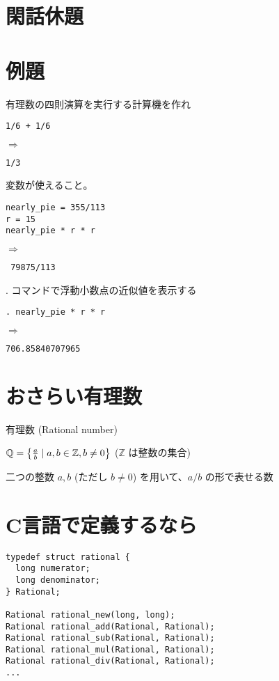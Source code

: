 \documentclass[slide,papersize,fleqn]{jsarticle}
\begin{document}
\section{閑話休題}
\figureA
\section{例題}
有理数の四則演算を実行する計算機を作れ
\tiny
\begin{tcolorbox}[box align=center,width=0.5\hsize,nobeforeafter]
  \texttt{1/6 + 1/6}
\end{tcolorbox}
{$\Rightarrow$}
\begin{tcolorbox}[box align=center,width=0.4\hsize,nobeforeafter]
\texttt{1/3}
\end{tcolorbox}
\vfill
変数が使えること。
\vfill
\begin{tcolorbox}[box align=center,width=0.5\hsize,nobeforeafter]
\begin{verbatim}
nearly_pie = 355/113
r = 15
nearly_pie * r * r
\end{verbatim}
\end{tcolorbox}
{$\Rightarrow$}
\begin{tcolorbox}[box align=center,width=0.4\hsize,nobeforeafter]
\texttt{ 79875/113}
\end{tcolorbox}
\vfill
. コマンドで浮動小数点の近似値を表示する
\vfill
\begin{tcolorbox}[box align=center,width=0.5\hsize,nobeforeafter]
\texttt{. nearly\_pie * r * r}
\end{tcolorbox}
{$\Rightarrow$}
\begin{tcolorbox}[box align=center,width=0.4\hsize,nobeforeafter]
\texttt{706.85840707965}
\end{tcolorbox}
\normalsize
\section{おさらい有理数}
有理数 (Rational number)

$\mathbb{Q} = \left\{{a \over b} \mid a, b \in \mathbb{Z}, b\ne
0\right\}$
($\mathbb{Z}$ は整数の集合)
\vspace{1em}

二つの整数 $a, b$ (ただし $b \ne 0$) を用いて、$a/b$ の形で表せる数

\section{C言語で定義するなら}
\tiny
\begin{verbatim}
typedef struct rational {
  long numerator;
  long denominator;
} Rational;

Rational rational_new(long, long);
Rational rational_add(Rational, Rational);  
Rational rational_sub(Rational, Rational);  
Rational rational_mul(Rational, Rational);  
Rational rational_div(Rational, Rational);
...
\end{verbatim}
\normalsize
\end{document}
